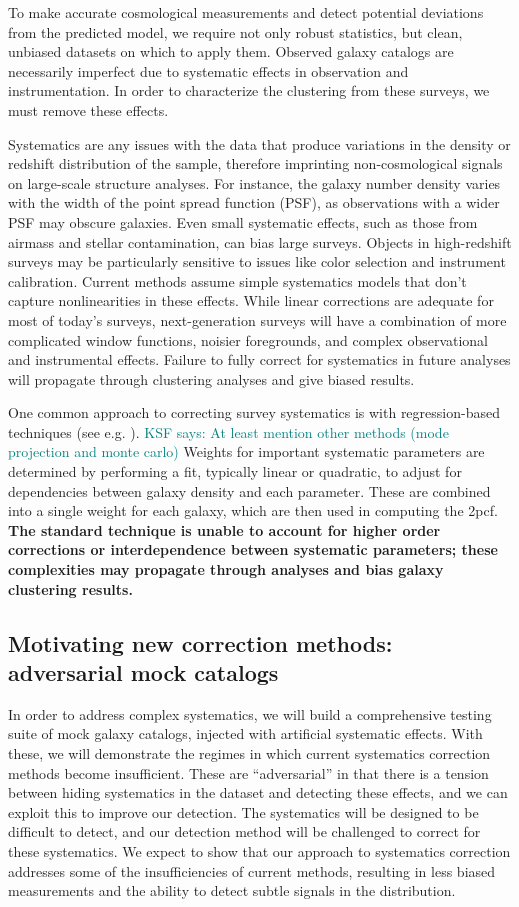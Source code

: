 \documentclass[12pt, fullpage, letterpaper]{article}
\newcommand{\KSF}[1]{\textcolor{teal}{KSF says: #1}}
\newcommand{\cf}{2pcf\xspace}
\begin{document}
To make accurate cosmological measurements and detect potential deviations from the predicted model, we require not only robust statistics, but clean, unbiased datasets on which to apply them.
Observed galaxy catalogs are necessarily imperfect due to systematic effects in observation and instrumentation. 
In order to characterize the clustering from these surveys, we must remove these effects.

Systematics are any issues with the data that produce variations in the density or redshift distribution of the sample, therefore imprinting non-cosmological signals on large-scale structure analyses.
For instance, the galaxy number density varies with the width of the point spread function (PSF), as observations with a wider PSF may obscure galaxies.
Even small systematic effects, such as those from airmass and stellar contamination, can bias large surveys. 
Objects in high-redshift surveys may be particularly sensitive to issues like color selection and instrument calibration.
Current methods assume simple systematics models that don't capture nonlinearities in these effects.
While linear corrections are adequate for most of today's surveys, next-generation surveys will have a combination of more complicated window functions, noisier foregrounds, and complex observational and instrumental effects.
Failure to fully correct for systematics in future analyses will propagate through clustering analyses and give biased results.

One common approach to correcting survey systematics is with regression-based techniques (see e.g. \citealt{Ross2010}). \KSF{At least mention other methods (mode projection and monte carlo)}
Weights for important systematic parameters are determined by performing a fit, typically linear or quadratic, to adjust for dependencies between galaxy density and each parameter.
These are combined into a single weight for each galaxy, which are then used in computing the \cf.
\textbf{The standard technique is unable to account for higher order corrections or interdependence between systematic parameters; these complexities may propagate through analyses and bias galaxy clustering results.}

\subsection{Motivating new correction methods: adversarial mock catalogs}

In order to address complex systematics, we will build a comprehensive testing suite of mock galaxy catalogs, injected with artificial systematic effects.
With these, we will demonstrate the regimes in which current systematics correction methods become insufficient.
These are ``adversarial'' in that there is a tension between hiding systematics in the dataset and detecting these effects, and we can exploit this to improve our detection.
The systematics will be designed to be difficult to detect, and our detection method will be challenged to correct for these systematics. 
We expect to show that our approach to systematics correction addresses some of the insufficiencies of current methods, resulting in less biased measurements and the ability to detect subtle signals in the distribution.
\end{document}
